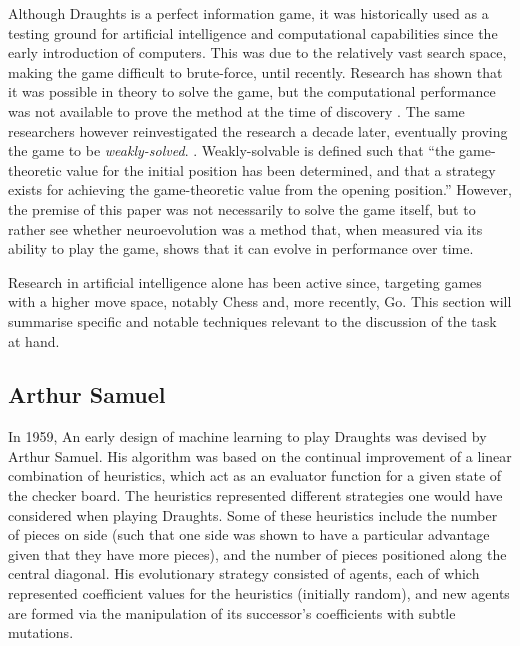 \documentclass[12pt,a4paper]{article}
\begin{document}
        Although Draughts is a perfect information game, it was historically used as a testing ground for artificial intelligence and computational capabilities since the early introduction of computers. This was due to the relatively vast search space, making the game difficult to brute-force, until recently. Research has shown that it was possible in theory to solve the game, but the computational performance was not available to prove the method at the time of discovery \cite{schaeffer_solving_1996}. The same researchers however reinvestigated the research a decade later, eventually proving the game to be \emph{weakly-solved}. \cite{schaeffer_checkers_2007}. Weakly-solvable is defined such that ``the game-theoretic value for the initial position has been determined, and that a strategy exists for achieving the game-theoretic value from the opening position.'' \cite{allis_searching_1994} However, the premise of this paper was not necessarily to solve the game itself, but to rather see whether neuroevolution was a method that, when measured via its ability to play the game, shows that it can evolve in performance over time.

        Research in artificial intelligence alone has been active since, targeting games with a higher move space, notably Chess and, more recently, Go. This section will summarise specific and notable techniques relevant to the discussion of the task at hand.

    \subsection{Arthur Samuel}
        In 1959, An early design of machine learning to play Draughts was devised by Arthur Samuel\cite{samuel_studies_1959}. His algorithm was based on the continual improvement of a linear combination of heuristics, which act as an evaluator function for a given state of the checker board. The heuristics represented different strategies one would have considered when playing Draughts. Some of these heuristics include the number of pieces on side (such that one side was shown to have a particular advantage given that they have more pieces), and the number of pieces positioned along the central diagonal. His evolutionary strategy consisted of agents, each of which represented coefficient values for the heuristics (initially random), and new agents are formed via the manipulation of its successor's coefficients with subtle mutations.
        
        
\end{document}
